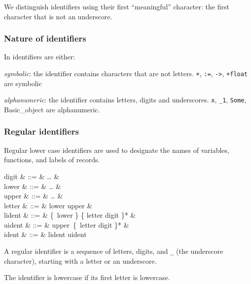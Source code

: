 We distinguish identifiers using their first ``meaningful'' character:
the first character that is not an underscore.

\subsubsection{Nature of identifiers}

In {\focal} identifiers are either:

\begin{citemize}
\item {\em symbolic}: the identifier contains characters that are not
  letters. {\tt +}, {\tt :=}, {\tt ->}, {\tt +float} are symbolic

\item {\em alphanumeric}: the identifier contains letters, digits and
  underscores. {\tt x}, {\tt \_1}, {\tt Some}, {Basic\_object} are alphanumeric.
\end{citemize}

\subsubsection{Regular identifiers}

Regular lower case identifiers are used to designate the names of variables, functions,
and labels of records.

\begin{syntax}
digit & ::= &  \ldots {} & \\
lower & ::= &  \ldots {} & \\
upper & ::= &  \ldots {} & \\
letter & ::= & lower \mid upper & \\
lident & ::= & \{\ lower \mid \terminal{\_} \}
            \{ letter \mid digit \mid \terminal{\_} \}* & \\
uident & ::= & upper\ \{\ letter \mid digit \mid \terminal{\_} \}* & \\
ident & ::= & lident \mid uident
\end{syntax}
\vspace{0.2cm}

A regular identifier is a sequence of letters, digits, and {\tt \_} (the
underscore character), starting with a letter or an underscore.

The identifier is lowercase if its first letter is lowercase.

